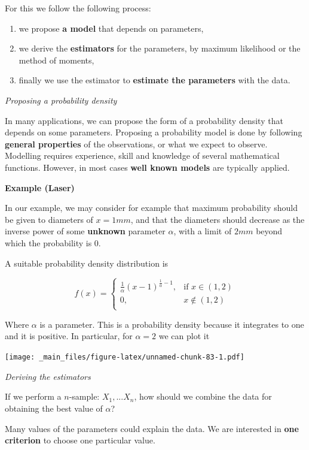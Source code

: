 \documentclass[
]{book}
\providecommand{\tightlist}{%
  \setlength{\itemsep}{0pt}\setlength{\parskip}{0pt}}
\begin{document}
For this we follow the following process:

\begin{enumerate}
\def\labelenumi{\arabic{enumi}.}
\tightlist
\item
  we propose \textbf{a model} that depends on parameters,
\item
  we derive the \textbf{estimators} for the parameters, by maximum likelihood or the method of moments,
\item
  finally we use the estimator to \textbf{estimate the parameters} with the data.
\end{enumerate}

\emph{Proposing a probability density}

In many applications, we can propose the form of a probability density that depends on some parameters. Proposing a probability model is done by following \textbf{general properties} of the observations, or what we expect to observe. Modelling requires experience, skill and knowledge of several mathematical functions. However, in most cases \textbf{well known models} are typically applied.

\textbf{Example (Laser)}

In our example, we may consider for example that maximum probability should be given to diameters of \(x=1mm\), and that the diameters should decrease as the inverse power of some \textbf{unknown} parameter \(\alpha\), with a limit of \(2mm\) beyond which the probability is \(0\).

A suitable probability density distribution is

\[
    f(x)= 
\begin{cases}
\frac{1}{\alpha}(x-1)^{\frac{1}{\alpha}-1},& \text{if } x \in (1,2)\\
    0,& x \notin (1,2)\\
\end{cases}
\]

Where \(\alpha\) is a parameter. This is a probability density because it integrates to one and it is positive. In particular, for \(\alpha=2\) we can plot it

\texttt{[image: \_main\_files/figure-latex/unnamed-chunk-83-1.pdf]}

\emph{Deriving the estimators}

If we perform a \(n\)-sample: \(X_1,...X_n\), how should we combine the data for obtaining the best value of \(\alpha\)?

Many values of the parameters could explain the data. We are interested in \textbf{one criterion} to choose one particular value.
\end{document}
